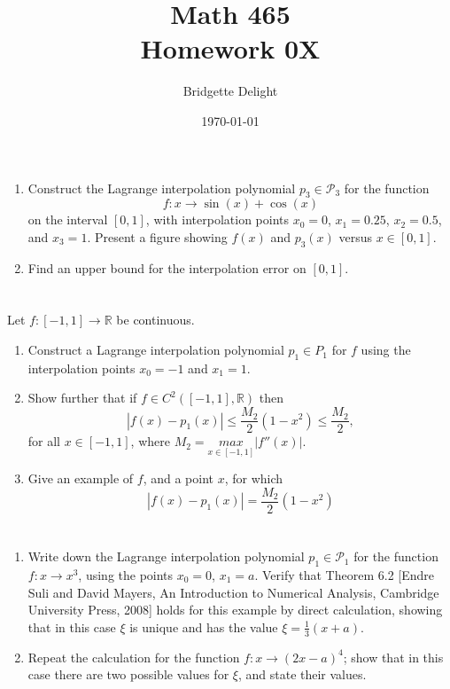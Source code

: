 \documentclass{article}
\title{{\large Math 465}\\ Homework 0X}
\author{Bridgette Delight}
\date{\today}
\begin{document}
\maketitle

\section{}
\begin{enumerate}[label = (\alph*)]
    \item  Construct the Lagrange interpolation polynomial $p_3 \in \mathcal{P}_3$ for the function
    \begin{equation*}
        f: x \to \sin(x) + \cos(x)
    \end{equation*}
    on the interval $[0, 1]$, with interpolation points $x_0 = 0$, $x_1 = 0.25$, $x_2 = 0.5$, and $x_3 = 1$. Present a figure showing $f(x)$ and $p_3(x)$ versus $x \in [0, 1]$.
    \item  Find an upper bound for the interpolation error on $[0, 1]$.
\end{enumerate}
\vspace{10mm}



\section{}
Let $f: [-1,1] \to \mathbb{R}$ be continuous.
\begin{enumerate}[label = (\alph*)]
    \item Construct a Lagrange interpolation polynomial $p_1 \in P_1$ for $f$ using the interpolation points $x_0 = -1$ and $x_1 = 1$.
    \item Show further that if $f \in C^2([-1,1], \mathbb{R})$ then $$|f(x)-p_1(x)| \le \frac{M_2}{2}(1-x^2) \le \frac{M_2}{2},$$
    for all $x \in [-1,1]$, where $M_2 = \underset{x \in [-1,1]}{max} |f''(x)|$.
    \item Give an example of $f$, and a point $x$, for which
    $$|f(x)-p_1(x)|= \frac{M_2}{2}(1-x^2)$$
\end{enumerate}
\vspace{10mm}


\section{}
\begin{enumerate}[label = (\alph*)]
    \item Write down the Lagrange interpolation polynomial $p_1 \in \mathcal{P}_1$ for the function $f:x \to x^3$, using the points $x_0 = 0$, $x_1 = a$. Verify that Theorem 6.2 [Endre Suli and David Mayers, An Introduction to Numerical Analysis, Cambridge University Press, 2008] holds for this example by direct calculation, showing that in this case $\xi$ is unique and has the value $\xi=\frac{1}{3}(x+a)$.
    \item Repeat the calculation for the function $f: x \to (2x-a)^4$; show that in this case there are two possible values for $\xi$, and state their values.
\end{enumerate}
\vspace{10mm}
\end{document}
